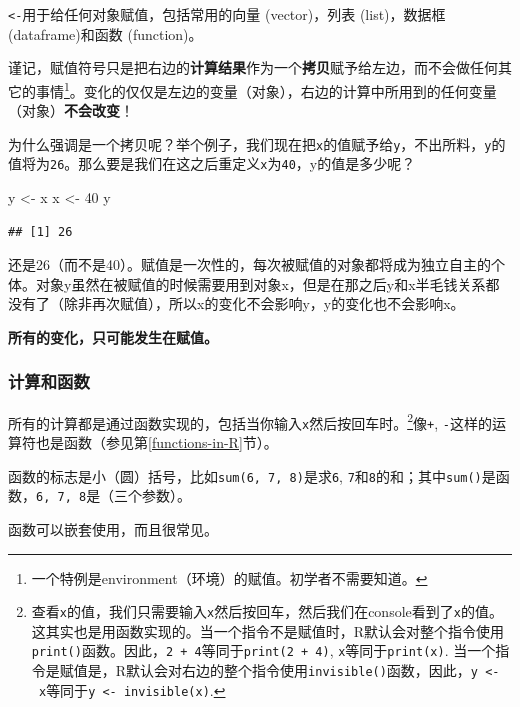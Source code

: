 \documentclass[]{book}
\newenvironment{Shaded}{\begin{snugshade}}{\end{snugshade}}
\newcommand{\DecValTok}[1]{\textcolor[rgb]{0.00,0.00,0.81}{#1}}
\newcommand{\NormalTok}[1]{#1}
\newcommand{\StringTok}[1]{\textcolor[rgb]{0.31,0.60,0.02}{#1}}
\let\rmarkdownfootnote\footnote%
\def\footnote{\protect\rmarkdownfootnote}
\begin{document}
\texttt{\textless{}-}用于给任何对象赋值，包括常用的向量 (vector)，列表 (list)，数据框 (dataframe)和函数 (function)。

谨记，赋值符号只是把右边的\textbf{计算结果}作为一个\textbf{拷贝}赋予给左边，而不会做任何其它的事情\footnote{一个特例是environment（环境）的赋值。初学者不需要知道。}。变化的仅仅是左边的变量（对象），右边的计算中所用到的任何变量（对象）\textbf{不会改变}！

为什么强调是一个拷贝呢？举个例子，我们现在把\texttt{x}的值赋予给\texttt{y}，不出所料，\texttt{y}的值将为\texttt{26}。那么要是我们在这之后重定义\texttt{x}为\texttt{40}，y的值是多少呢？

\begin{Shaded}
\begin{Highlighting}[]
\NormalTok{y <-}\StringTok{ }\NormalTok{x}
\NormalTok{x <-}\StringTok{ }\DecValTok{40}
\NormalTok{y}
\end{Highlighting}
\end{Shaded}

\begin{verbatim}
## [1] 26
\end{verbatim}

还是26（而不是40）。赋值是一次性的，每次被赋值的对象都将成为独立自主的个体。对象y虽然在被赋值的时候需要用到对象x，但是在那之后y和x半毛钱关系都没有了（除非再次赋值），所以x的变化不会影响y，y的变化也不会影响x。

\textbf{所有的变化，只可能发生在赋值。}

\subsubsection{计算和函数}

所有的计算都是通过函数实现的，包括当你输入\texttt{x}然后按回车时。\footnote{查看\texttt{x}的值，我们只需要输入\texttt{x}然后按回车，然后我们在console看到了\texttt{x}的值。这其实也是用函数实现的。当一个指令不是赋值时，R默认会对整个指令使用\texttt{print()}函数。因此，\texttt{2\ +\ 4}等同于\texttt{print(2\ +\ 4)}, \texttt{x}等同于\texttt{print(x)}. 当一个指令是赋值是，R默认会对右边的整个指令使用\texttt{invisible()}函数，因此，\texttt{y\ \textless{}-\ x}等同于\texttt{y\ \textless{}-\ invisible(x)}.}像\texttt{+}, \texttt{-}这样的运算符也是函数（参见第\ref{functions-in-R}节）。

函数的标志是小（圆）括号，比如\texttt{sum(6,\ 7,\ 8)}是求\texttt{6}, \texttt{7}和\texttt{8}的和；其中\texttt{sum()}是函数，\texttt{6,\ 7,\ 8}是（三个参数）。

函数可以嵌套使用，而且很常见。
\end{document}
